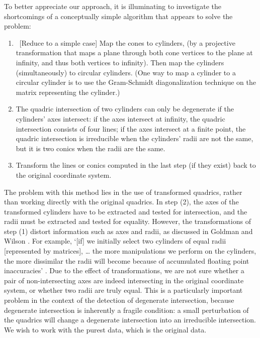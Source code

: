 \begin{remark}
To better appreciate our approach, it is illuminating to investigate
the shortcomings of a conceptually simple algorithm that appears to
solve the problem:

\begin{enumerate}
\item
	\ [Reduce to a simple case] Map the cones to cylinders,
	(by a projective transformation 
	that maps a plane through both cone vertices to the plane at
	infinity, and thus both vertices to infinity).
	Then map the cylinders (simultaneously) to circular cylinders.
	(One way to map a cylinder to a circular cylinder is to use
	the Gram-Schmidt diagonalization technique on the matrix
	representing the cylinder.)
\item
	The quadric intersection of two cylinders can only be
	degenerate if the cylinders' axes intersect: if the axes
	intersect at infinity, the quadric intersection consists
	of four lines; if the axes intersect at a finite point,
	the quadric intersection is irreducible when the cylinders'
	radii are not the same, but it is two conics when the radii 
	are the same.
\item
	Transform the lines or conics
	computed in the last step (if they exist)
	back to the original coordinate system.
\end{enumerate}

\noindent The problem with this method lies in the use of transformed quadrics,
rather than working directly with the original quadrics.
In step (2), the axes of the transformed cylinders have to be extracted 
and tested for intersection, and the radii must be extracted and tested 
for equality.  
However, the transformations of step (1) 
distort information such as axes and radii,
as discussed in Goldman \cite{goldman:1983b} and Wilson \cite{wilson:1987}.
For example, `[if] we initially select two cylinders of equal radii
[represented by matrices], \ldots
the more manipulations we perform on the cylinders, the more dissimilar
the radii will become because of accumulated floating point inaccuracies'
\cite[p. 22]{goldman:1983b}.
Due to the effect of transformations, we are not sure whether a pair
of non-intersecting axes are indeed intersecting in the original
coordinate system, or whether two radii are truly equal.
This is a particularly important problem in the context of the detection
of degenerate intersection, because degenerate intersection is inherently
a fragile condition: a small perturbation of the quadrics will change a
degenerate intersection into an irreducible intersection.
We wish to work with the purest data, which is the original data.


\end{remark}
